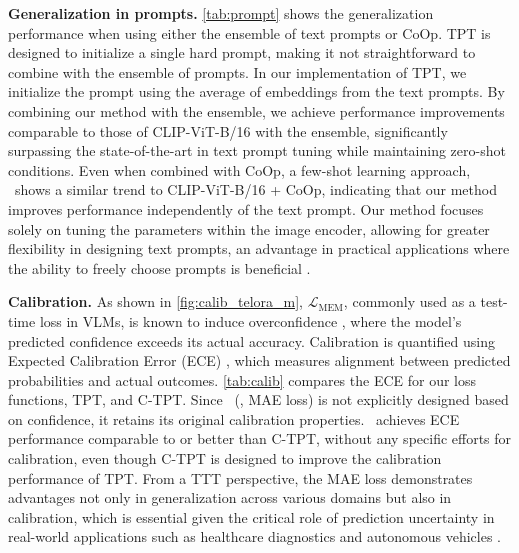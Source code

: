 \noindent\textbf{Generalization in prompts.}\hspace{5mm}
\cref{tab:prompt} shows the generalization performance when using either the ensemble of text prompts or CoOp.
TPT is designed to initialize a single hard prompt, making it not straightforward to combine with the ensemble of prompts.
In our implementation of TPT, we initialize the prompt using the average of embeddings from the text prompts.
By combining our method with the ensemble, we achieve performance improvements comparable to those of CLIP-ViT-B/16 with the ensemble, significantly surpassing the state-of-the-art in text prompt tuning while maintaining zero-shot conditions.
Even when combined with CoOp, a few-shot learning approach, \name\ shows a similar trend to CLIP-ViT-B/16 + CoOp, indicating that our method improves performance independently of the text prompt.
Our method focuses solely on tuning the parameters within the image encoder, allowing for greater flexibility in designing text prompts, an advantage in practical applications where the ability to freely choose prompts is beneficial \citep{gu2023systematic}.
\newline

\noindent\textbf{Calibration.}\hspace{5mm}
As shown in \cref{fig:calib_telora_m}, $\mathcal{L}_{\text{MEM}}$, commonly used as a test-time loss in VLMs, is known to induce overconfidence \citep{guo2017calibration,yoon2024c}, where the model's predicted confidence exceeds its actual accuracy.
Calibration is quantified using Expected Calibration Error (ECE) \citep{naeini2015obtaining}, which measures alignment between predicted probabilities and actual outcomes.
\cref{tab:calib} compares the ECE for our loss functions, TPT, and C-TPT.
Since \namemae\ (\ie, MAE loss) is not explicitly designed based on confidence, it retains its original calibration properties.
\namemae\ achieves ECE performance comparable to or better than C-TPT, without any specific efforts for calibration, even though C-TPT is designed to improve the calibration performance of TPT.
From a TTT perspective, the MAE loss demonstrates advantages not only in generalization across various domains but also in calibration, which is essential given the critical role of prediction uncertainty in real-world applications such as healthcare diagnostics \citep{wang2022medclip,liu2023clip} and autonomous vehicles \citep{dorbala2022clip,khandelwal2022simple}.
\newline

